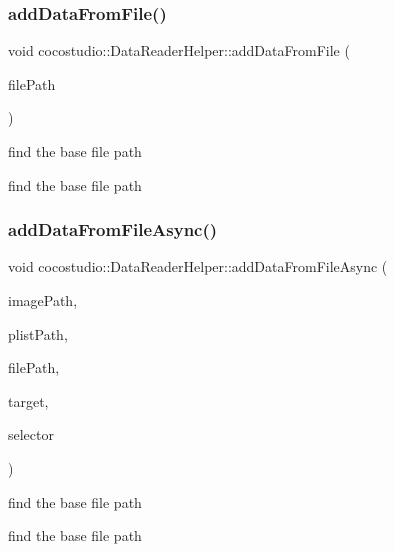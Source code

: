 \subsubsection{\texorpdfstring{add\+Data\+From\+File()}{addDataFromFile()}}
{\footnotesize\ttfamily void cocostudio\+::\+Data\+Reader\+Helper\+::add\+Data\+From\+File (\begin{DoxyParamCaption}\item[{const std\+::string \&}]{file\+Path }\end{DoxyParamCaption})}

find the base file path

find the base file path \mbox{\label{classcocostudio_1_1DataReaderHelper_ae12002a304bfeff2a64ba436fbb4f7b7}} 
\subsubsection{\texorpdfstring{add\+Data\+From\+File\+Async()}{addDataFromFileAsync()}}
{\footnotesize\ttfamily void cocostudio\+::\+Data\+Reader\+Helper\+::add\+Data\+From\+File\+Async (\begin{DoxyParamCaption}\item[{const std\+::string \&}]{image\+Path,  }\item[{const std\+::string \&}]{plist\+Path,  }\item[{const std\+::string \&}]{file\+Path,  }\item[{cocos2d\+::\+Ref $\ast$}]{target,  }\item[{cocos2d\+::\+S\+E\+L\+\_\+\+S\+C\+H\+E\+D\+U\+LE}]{selector }\end{DoxyParamCaption})}

find the base file path

find the base file path \mbox{\label{classcocostudio_1_1DataReaderHelper_ab812fe6a19b59203fa3984b34158c592}} 
